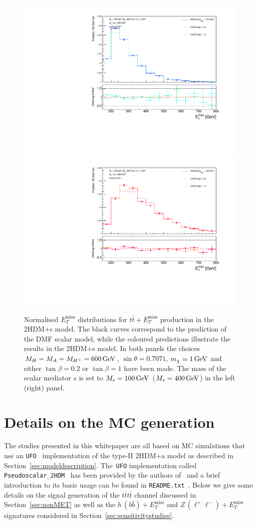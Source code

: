 \documentclass[a4paper, 11pt,notoc]{article}
\newcommand{\MET}{\ensuremath{E_T^\mathrm{miss}}\xspace}
\newcommand{\hdma}{\ensuremath{\textrm{2HDM+a}}\xspace}
\begin{document}
\begin{figure}
\centering
\includegraphics[width=.475\textwidth]{Met100GeV.pdf} \quad 
\includegraphics[width=.475\textwidth]{Met400GeV.pdf}
\vspace{2mm}
\caption{ Normalised $\MET$ distributions for $t \bar t + \MET$ production in the 2HDM+s model. The black curves correspond to the prediction of the DMF scalar   model, while the coloured predictions illustrate the results in the 2HDM+s  model. In both panels the choices $M_H = M_A = M_{H^\pm} = 600 \, {\rm GeV}$, $\sin \theta = 0.7071$, $m_\chi = 1 \, {\rm GeV}$ and either $\tan \beta = 0.2$ or $\tan \beta = 1$ have been made. The mass of the scalar mediator $s$ is set to $M_s = 100 \, {\rm GeV}$ ($M_s = 400 \, {\rm GeV}$) in the left (right) panel.}
\label{fig:ttMETscalar}
\end{figure}


\section{Details on the MC generation}
\label{app:mcgeneration}

The studies presented in this whitepaper are all based on MC simulations that use an {\tt UFO}~\cite{Degrande:2011ua} implementation of the type-II \hdma model as described in Section~\ref{sec:modeldescription}. The~{\tt UFO} implementation  called {\tt Pseudoscalar\_2HDM}~\cite{hdmaUFO} has been provided by the authors of~\cite{Bauer:2017ota} and a brief introduction to its basic usage can be found in {\tt README.txt}~\cite{hdmaREADME}. Below we give some details on   the signal generation of the $t \bar t t \bar t$ channel discussed in Section~\ref{sec:nonMET} as well as  the $h \, (b \bar b) + \MET$ and $Z \, (\ell^+ \ell^-)+ \MET$ signatures  considered in Section~\ref{sec:sensitivitystudies}.
\end{document}
